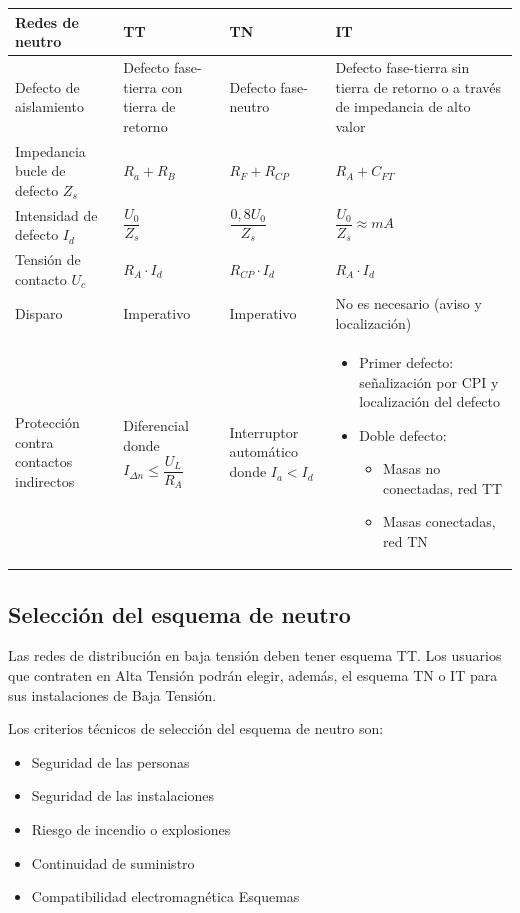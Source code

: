 \renewcommand{\arraystretch}{1.5}
\begin{tabular}{|p{3cm}|p{3cm}|p{3cm}|p{5cm}|}
	\hline
	Redes de neutro & TT & TN & IT \\ \hline
	Defecto de aislamiento & 
	Defecto fase-tierra con tierra de retorno & 
	Defecto fase-neutro & 
	Defecto fase-tierra sin tierra de retorno o a través de impedancia de alto valor \\ \hline
	Impedancia bucle de defecto $Z_s$& $R_a+R_B$&$R_F+R_{CP}$&$R_A+C_{FT}$\\ \hline
	Intensidad de defecto $I_d$&$\dfrac{U_0}{Z_s} $&$\dfrac{0,8 U_0}{Z_s} $&$\dfrac{U_0}{Z_s} \approx mA$\\ \hline
	Tensión de contacto $U_c$&$R_A\cdot I_d$&$R_{CP}\cdot I_d$& $R_A\cdot I_d$\\ \hline
	Disparo& Imperativo& Imperativo& No es necesario (aviso y localización)\\ \hline
	Protección contra contactos indirectos& Diferencial donde $I_{\Delta n}\le \dfrac{U_L}{R_A}$& Interruptor automático donde $I_a < I_d$& \begin{itemize}
		\item Primer defecto: señalización por CPI y localización del defecto
		\item Doble defecto:
		\begin{itemize}
			\item Masas no conectadas, red TT
			\item Masas conectadas, red TN
		\end{itemize}
	\end{itemize}\\ \hline
\end{tabular}

\subsection{Selección del esquema de neutro}
Las redes de distribución en baja tensión deben tener esquema TT. Los usuarios que contraten en Alta Tensión podrán elegir, además, el
esquema TN o IT para sus instalaciones de Baja Tensión.
\newline

Los criterios técnicos de selección del esquema de neutro son: 
\begin{itemize}
	\item Seguridad de las personas
	\item Seguridad de las instalaciones
	\item Riesgo de incendio o explosiones
	\item Continuidad de suministro
	\item Compatibilidad electromagnética
	Esquemas
\end{itemize}

